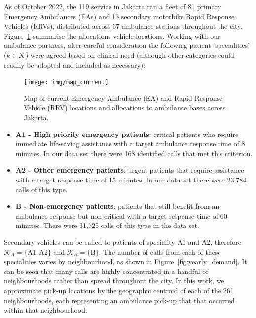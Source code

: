 \documentclass[numbers,webpdf,imaman]{ima-authoring-template}%
\begin{document}
As of October 2022, the 119 service in Jakarta ran a fleet of 81 primary
Emergency Ambulances (EAs) and 13 secondary motorbike Rapid Response Vehicles
(RRVs), distributed across 67 ambulance stations throughout the city.
Figure~\ref{fig:current_allocation} summarise the allocations vehicle
locations.
Working with our ambulance partners, after careful consideration the following
patient `specialities' ($k \in \mathcal{K}$) were agreed based on clinical need
(although other categories could readily be adopted and included as necessary):

\begin{figure}
\begin{center}
\texttt{[image: img/map\_current]}
\caption{Map of current Emergency Ambulance (EA) and Rapid Response Vehicle
         (RRV) locations and allocations to ambulance bases across Jakarta.}
\label{fig:current_allocation}
\end{center}
\end{figure}

\begin{itemize}
  \item \textbf{A1 - High priority emergency patients}: critical patients who
  require immediate life-saving assistance with a target ambulance response
  time of 8 minutes. In our data set there were 168 identified calls that met
  this criterion.
  \item \textbf{A2 - Other emergency patients}: urgent patients that require
  assistance with a target response time of 15 minutes. In our data set there
  were 23,784 calls of this type.
  \item \textbf{B - Non-emergency patients}: patients that still benefit from
  an ambulance response but non-critical with a target response time of 60
  minutes. There were 31,725 calls of this type in the data set.
\end{itemize}

Secondary vehicles can be called to patients of speciality A1 and A2,
therefore $\mathcal{K}_A = \{\text{A1}, \text{A2}\}$ and
$\mathcal{K}_B = \{\text{B}\}$.
The number of calls from each of these specialities varies by neighbourhood,
as shown in Figure~\ref{fig:yearly_demand}. It can be seen that many calls are
highly concentrated in a handful of neighbourhoods rather than spread
throughout the city. In this work, we approximate pick-up locations by the
geographic centroid of each of the 261 neighbourhoods, each representing an
ambulance pick-up that that occurred within that neighbourhood.
\end{document}

